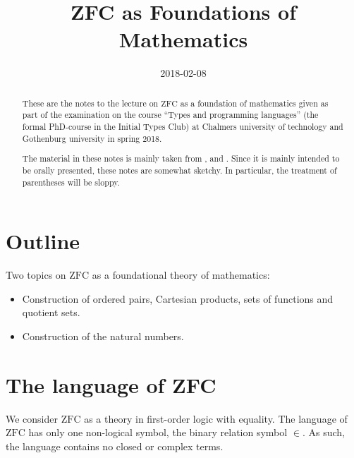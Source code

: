\documentclass{scrartcl}
\title{ZFC as Foundations of Mathematics}
\date{2018-02-08}
\theoremstyle{definition}
\theoremstyle{plain}
\theoremstyle{remark}
\newcommand{\ZFC}{\ensuremath{\mathrm{ZFC}}}
\begin{document}
\begin{abstract}
  These are the notes to the lecture on $\ZFC$ as a foundation of mathematics given as part of the examination on the course ``Types and programming languages'' (the formal PhD-course in the Initial Types Club) at Chalmers university of technology and Gothenburg university in spring 2018.

  The material in these notes is mainly taken from \cite{jech:2002}, \cite{moschovakis:2006} and \cite{aczel_rathjen:2001}. Since it is mainly intended to be orally presented, these notes are somewhat sketchy. In particular, the treatment of parentheses will be sloppy.
\end{abstract}

\setcounter{secnumdepth}{0}

\section*{Outline}
\label{sec:outline}

Two topics on $\ZFC$ as a foundational theory of mathematics:
\begin{itemize}
\item Construction of ordered pairs, Cartesian products, sets of functions and quotient sets.
\item Construction of the natural numbers.
\end{itemize}

\setcounter{secnumdepth}{2}

\tableofcontents

\section{The language of ZFC}
\label{sec:lang}

We consider $\ZFC$ as a theory in first-order logic with equality. The language of $\ZFC$ has only one non-logical symbol, the binary relation symbol $\in$. As such, the language contains no closed or complex terms.
\end{document}
